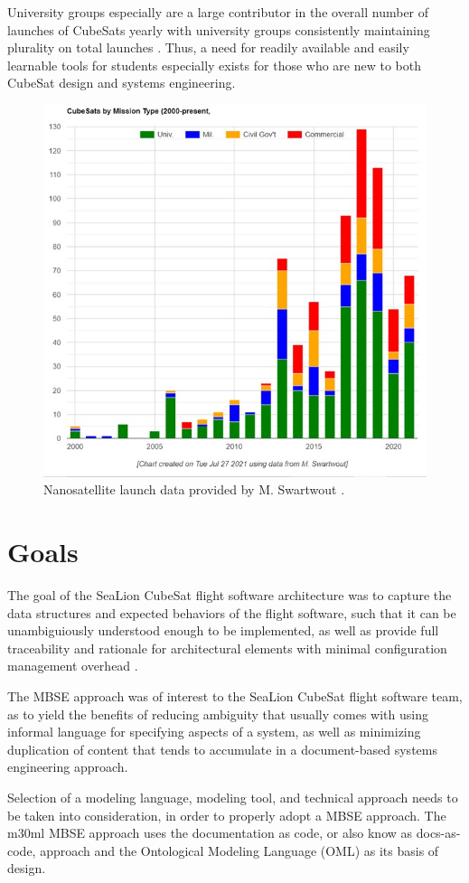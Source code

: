\documentclass[conf]{new-aiaa}
\begin{document}
University groups especially are a large contributor in the overall number of launches of CubeSats yearly with university groups consistently maintaining plurality on total launches \cite{swartwout_data}. Thus, a need for readily available and easily learnable tools for students especially exists for those who are new to both CubeSat design and systems engineering.

\begin{figure}[hbt!]
    \centering
    \includegraphics[width=.5\textwidth]{swartwout_data_graph}
    \caption{Nanosatellite launch data provided by M. Swartwout \cite{swartwout_data}.}
    \label{swartwout_data_graph}
\end{figure}

\section{Goals}

The goal of the SeaLion CubeSat flight software architecture was to capture the data structures and expected behaviors of the flight software, such that it can be unambiguiously understood enough to be implemented, as well as provide full traceability and rationale for architectural elements with minimal configuration management overhead \cite{sealion_mission_architecture}.

The MBSE approach was of interest to the SeaLion CubeSat flight software team, as to yield the benefits of reducing ambiguity that usually comes with using informal language for specifying aspects of a system, as well as minimizing duplication of content that tends to accumulate in a document-based systems engineering approach.

Selection of a modeling language, modeling tool, and technical approach needs to be taken into consideration, in order to properly adopt a MBSE approach.  The m30ml MBSE approach uses the documentation as code, or also know as docs-as-code, approach and the Ontological Modeling Language (OML) as its basis of design.
\end{document}
